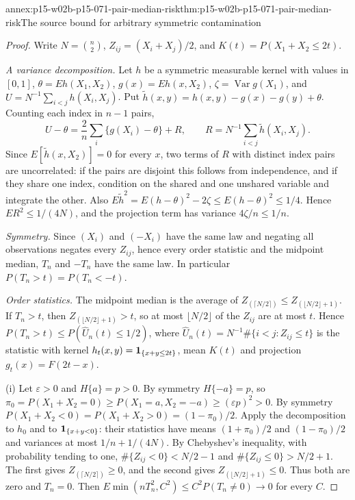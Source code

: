 \begin{annexitem}{annex:p15-w02b-p15-071-pair-median-risk}{thm:p15-w02b-p15-071-pair-median-risk}{The source bound for arbitrary symmetric contamination}
\begin{proof}
Write \(N=\binom n2\), \(Z_{ij}=(X_i+X_j)/2\), and
\(K(t)=P(X_1+X_2\leq2t)\).

\emph{A variance decomposition.} Let \(h\) be a symmetric measurable
kernel with values in \([0,1]\), \(\theta=Eh(X_1,X_2)\),
\(g(x)=Eh(x,X_2)\), \(\zeta=\operatorname{Var}g(X_1)\), and
\(U=N^{-1}\sum_{i<j}h(X_i,X_j)\). Put
\(\tilde h(x,y)=h(x,y)-g(x)-g(y)+\theta\). Counting each index in
\(n-1\) pairs,
\[
 U-\theta=\frac2n\sum_i\{g(X_i)-\theta\}+R,\qquad
 R=N^{-1}\sum_{i<j}\tilde h(X_i,X_j).
\]
Since \(E[\tilde h(x,X_2)]=0\) for every \(x\), two terms of \(R\)
with distinct index pairs are uncorrelated: if the pairs are disjoint
this follows from independence, and if they share one index, condition
on the shared and one unshared variable and integrate the other.
Also \(E\tilde h^2=E(h-\theta)^2-2\zeta\leq E(h-\theta)^2\leq1/4\).
Hence \(ER^2\leq1/(4N)\), and the projection term has variance
\(4\zeta/n\leq1/n\).

\emph{Symmetry.} Since \((X_i)\) and \((-X_i)\) have the same law and
negating all observations negates every \(Z_{ij}\), hence every order
statistic and the midpoint median, \(T_n\) and \(-T_n\) have the same
law. In particular \(P(T_n>t)=P(T_n<-t)\).

\emph{Order statistics.} The midpoint median is the average of
\(Z_{(\lceil N/2\rceil)}\leq Z_{(\lfloor N/2\rfloor+1)}\).
If \(T_n>t\), then \(Z_{(\lfloor N/2\rfloor+1)}>t\), so at most
\(\lfloor N/2\rfloor\) of the \(Z_{ij}\) are at most \(t\). Hence
\(P(T_n>t)\leq P(\widehat U_n(t)\leq1/2)\), where
\(\widehat U_n(t)=N^{-1}\#\{i<j:Z_{ij}\leq t\}\) is the statistic with
kernel \(h_t(x,y)={\bf1}_{\{x+y\leq2t\}}\), mean \(K(t)\) and projection
\(g_t(x)=F(2t-x)\).

(i) Let \(\varepsilon>0\) and \(H\{a\}=p>0\). By symmetry \(H\{-a\}=p\),
so \(\pi_0=P(X_1+X_2=0)\geq P(X_1=a,X_2=-a)\geq(\varepsilon p)^2>0\).
By symmetry \(P(X_1+X_2<0)=P(X_1+X_2>0)=(1-\pi_0)/2\).
Apply the decomposition to \(h_0\) and to
\({\bf1}_{\{x+y<0\}}\): their statistics have means \((1+\pi_0)/2\) and
\((1-\pi_0)/2\) and variances at most \(1/n+1/(4N)\). By Chebyshev's
inequality, with probability tending to one,
\(\#\{Z_{ij}<0\}<N/2-1\) and \(\#\{Z_{ij}\leq0\}>N/2+1\).
The first gives \(Z_{(\lceil N/2\rceil)}\geq0\), and the second gives
\(Z_{(\lfloor N/2\rfloor+1)}\leq0\). Thus both are zero and \(T_n=0\).
Then \(E\min(nT_n^2,C^2)\leq C^2P(T_n\neq0)\to0\) for every \(C\).


\end{proof}
\end{annexitem}
